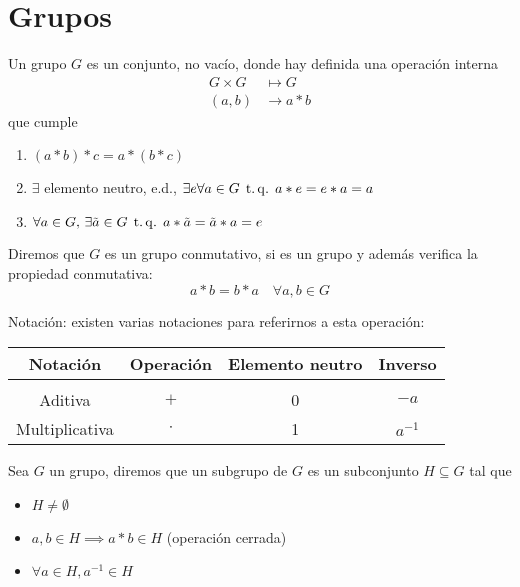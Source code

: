 \chapter{Grupos}

\begin{defi}[grupo]
    Un grupo $G$ es un conjunto, no vacío, donde hay definida una operación interna
    \[
        \begin{aligned}
            G \times G &\mapsto G \\
            (a, b) &\to a * b
        \end{aligned}
    \]
    que cumple
    \begin{enumerate}
        \item $(a*b)*c = a*(b*c)$
        \item $\exists$ elemento neutro, e.d., $\exists e \forall a \in G \operatorname{\;t.q.\;} a*e = e*a = a$
        \item $\forall a \in G, \, \exists \tilde{a} \in G \operatorname{\;t.q.\;} a * \tilde{a} = \tilde{a}*a = e$
    \end{enumerate}
\end{defi}

\begin{defi}
    Diremos que $G$ es un grupo conmutativo, si es un grupo y además verifica la propiedad conmutativa:
    \[
        a*b = b*a \quad \forall a, b \in G
    \]
\end{defi}

\begin{obs}
    Notación: existen varias notaciones para referirnos a esta operación:
    \begin{tabular}{cccc}
        Notación & Operación & Elemento neutro & Inverso \\
        \hline \\
        Aditiva & $+$ & 0 & $-a$ \\
        Multiplicativa & $\cdot$ & 1 & $a^{-1}$ 
    \end{tabular}
\end{obs}

\begin{defi}[subgrupo]
    Sea $G$ un grupo, diremos que un subgrupo de $G$ es un subconjunto $H \subseteq G$ tal que
    \begin{itemize}
        \item $H \neq \emptyset$
        \item $a, b \in H \implies a*b \in H$ (operación cerrada)
        \item $\forall a \in H, a^{-1} \in H$
    \end{itemize}
\end{defi}

